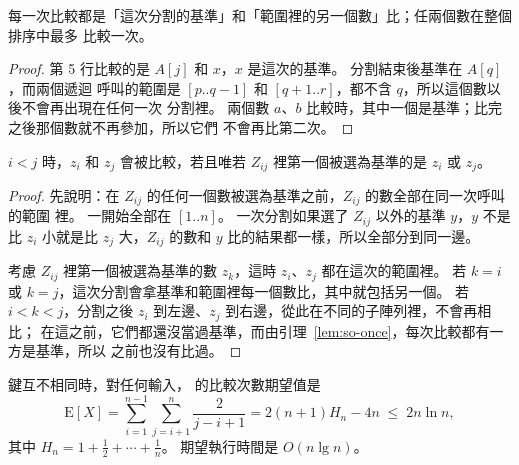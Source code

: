 \begin{lemma}
\label{lem:so-once}
每一次比較都是「這次分割的基準」和「範圍裡的另一個數」比；任兩個數在整個排序中最多
比較一次。
\end{lemma}

\begin{proof}
第 5 行比較的是 $A[j]$ 和 $x$，$x$ 是這次的基準。 分割結束後基準在 $A[q]$，而兩個遞迴
呼叫的範圍是 $[p..q-1]$ 和 $[q+1..r]$，都不含 $q$，所以這個數以後不會再出現在任何一次
分割裡。 兩個數 $a$、$b$ 比較時，其中一個是基準；比完之後那個數就不再參加，所以它們
不會再比第二次。
\end{proof}

\begin{lemma}
\label{lem:so-pair}
$i < j$ 時，$z_i$ 和 $z_j$ 會被比較，若且唯若 $Z_{ij}$ 裡第一個被選為基準的是 $z_i$ 或
$z_j$。
\end{lemma}

\begin{proof}
先說明：在 $Z_{ij}$ 的任何一個數被選為基準之前，$Z_{ij}$ 的數全部在同一次呼叫的範圍
裡。 一開始全部在 $[1..n]$。 一次分割如果選了 $Z_{ij}$ 以外的基準 $y$，$y$ 不是比
$z_i$ 小就是比 $z_j$ 大，$Z_{ij}$ 的數和 $y$ 比的結果都一樣，所以全部分到同一邊。

考慮 $Z_{ij}$ 裡第一個被選為基準的數 $z_k$，這時 $z_i$、$z_j$ 都在這次的範圍裡。 若
$k = i$ 或 $k = j$，這次分割會拿基準和範圍裡每一個數比，其中就包括另一個。 若
$i < k < j$，分割之後 $z_i$ 到左邊、$z_j$ 到右邊，從此在不同的子陣列裡，不會再相比；
在這之前，它們都還沒當過基準，而由引理~\ref{lem:so-once}，每次比較都有一方是基準，所以
之前也沒有比過。
\end{proof}

\begin{theorem}
\label{thm:so-quick-avg}
鍵互不相同時，對任何輸入， 的比較次數期望值是
\[
\mathrm{E}[X] = \sum_{i=1}^{n-1} \sum_{j=i+1}^{n} \frac{2}{j - i + 1} = 2(n+1)H_n - 4n
\;\le\; 2n \ln n,
\]
其中 $H_n = 1 + \frac12 + \cdots + \frac1n$。 期望執行時間是 $O(n \lg n)$。
\end{theorem}

